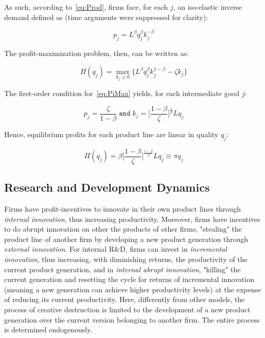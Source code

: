 \documentclass[letterpaper,12pt]{article}
\theoremstyle{definition}
\begin{document}
As such, according to~\eqref{eq:Prod}, firms face, for each $j$, an iso-elastic inverse demand defined as (time arguments were suppressed for clarity):

\begin{equation} \label{eq:Price}
p_j =  L^{\beta}q_j^{\beta}k_j^{-\beta}
\end{equation}

The profit-maximization problem, then, can be written as:

\begin{equation} \label{eq:PiMax}
\Pi(q_j) = \max\limits_{k_j \geq 0}\Big\{L^{\beta}q_j^{\beta}k_j^{1-\beta} - \zeta k_j\Big\}
\end{equation}

The first-order condition for~\ref{eq:PiMax} yields, for each intermediate good $j$:

\begin{equation} \label{eq:FOC}
p_j = \frac{\zeta}{1-\beta}\; \texttt{and}\;k_j = \Big[\frac{1-\beta}{\zeta}\Big]^{\frac{1}{\beta}}Lq_j
\end{equation}

Hence, equilibrium profits for each product line are linear in quality $q_j$:

\begin{equation} \label{eq:EqProfit}
\Pi(q_j) = \beta\Big[\frac{1-\beta}{\zeta}\Big]^{\frac{1-\beta}{\beta}}Lq_j \equiv \pi q_j
\end{equation}

\subsection{Research and Development Dynamics}

Firms have profit-incentives to innovate in their own product lines through \textit{internal innovation}, thus increasing productivity. Moreover, firms have incentives to do abrupt innovation on other the products of other firms, "stealing" the product line of another firm by developing a new product generation through \textit{external innovation}. For internal R\&D, firms can invest in \textit{incremental innovation}, thus increasing, with diminishing returns, the productivity of the current product generation, and in \textit{internal abrupt innovation}, "killing" the current generation and resetting the cycle for returns of incremental innovation (meaning a new generation can achieve higher productivity levels) at the expense of reducing its current productivity. Here, differently from other models, the process of creative destruction is limited to the development of a new product generation over the current version belonging to another firm. The entire process is determined endogenously. 
\end{document}
